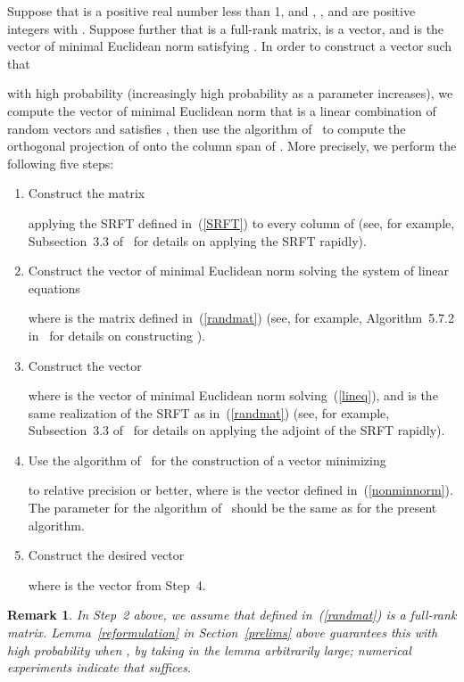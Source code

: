 \documentclass[letterpaper,12pt]{article}
\newtheorem{remark1}[theorem]{Remark}
\newenvironment{remark}{\begin{remark1} \rm}{\end{remark1}}
\begin{document}
Suppose that  is a positive real number less than 1,
and , , and  are positive integers with .
Suppose further that  is a full-rank matrix,
 is a vector, and  is the vector
of minimal Euclidean norm satisfying
.
In order to construct a vector  such that

with high probability (increasingly high probability as a parameter 
increases), we compute the vector  of minimal Euclidean norm
that is a linear combination of random vectors
and satisfies ,
then use the algorithm of~\cite{rokhlin-tygert}
to compute the orthogonal projection of 
onto the column span of .
More precisely, we perform the following five steps:


\begin{enumerate}
\item Construct the matrix

applying the SRFT  defined in~(\ref{SRFT})
      to every column of 
      (see, for example, Subsection~3.3 of~\cite{woolfe-liberty-rokhlin-tygert}
      for details on applying the SRFT rapidly).
\item Construct the vector  of minimal Euclidean norm
      solving the system of linear equations

where  is the matrix defined in~(\ref{randmat})
      (see, for example, Algorithm~5.7.2 in~\cite{golub-van_loan}
      for details on constructing ).
\item Construct the vector

where  is the vector of minimal Euclidean norm
      solving~(\ref{lineq}), and  is the same realization
      of the SRFT as in~(\ref{randmat})
      (see, for example, Subsection~3.3 of~\cite{woolfe-liberty-rokhlin-tygert}
      for details on applying the adjoint of the SRFT rapidly).
\item Use the algorithm of~\cite{rokhlin-tygert} for the construction
      of a vector  minimizing

to relative precision  or better,
      where  is the vector defined in~(\ref{nonminnorm}).
      The parameter  for the algorithm of~\cite{rokhlin-tygert}
      should be the same as for the present algorithm.
\item Construct the desired vector

where  is the vector from Step~4.
\end{enumerate}


\begin{remark}
In Step~2 above, we assume that  defined in~(\ref{randmat})
is a full-rank matrix. Lemma~\ref{reformulation} in Section~\ref{prelims}
above guarantees this with high probability when ,
by taking  in the lemma arbitrarily large;
numerical experiments indicate that  suffices.
\end{remark}
\end{document}
